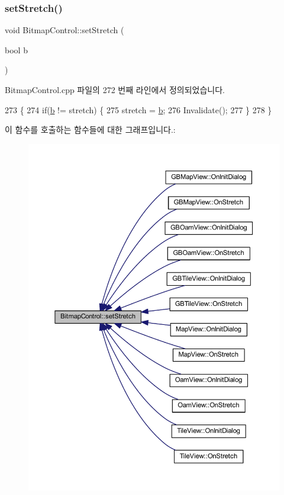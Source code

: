 \subsubsection{\texorpdfstring{set\+Stretch()}{setStretch()}}
{\footnotesize\ttfamily void Bitmap\+Control\+::set\+Stretch (\begin{DoxyParamCaption}\item[{bool}]{b }\end{DoxyParamCaption})}



Bitmap\+Control.\+cpp 파일의 272 번째 라인에서 정의되었습니다.


\begin{DoxyCode}
273 \{
274   \textcolor{keywordflow}{if}(\mbox{\hyperlink{expr-lex_8cpp_a91b64995742fd30063314f12340b4b5a}{b}} != stretch) \{
275     stretch = \mbox{\hyperlink{expr-lex_8cpp_a91b64995742fd30063314f12340b4b5a}{b}};
276     Invalidate();
277   \}
278 \}
\end{DoxyCode}
이 함수를 호출하는 함수들에 대한 그래프입니다.\+:
\nopagebreak
\begin{figure}[H]
\begin{center}
\leavevmode
\includegraphics[width=350pt]{class_bitmap_control_ab545e15ea3edda9f0d80c0b8b0b7c812_icgraph}
\end{center}
\end{figure}


